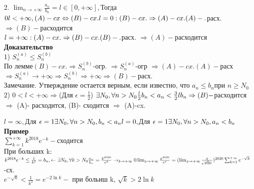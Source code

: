 \documentclass[12pt, a4paper]{article}
\begin{document}
 2. $ \lim_{n \rightarrow +\infty} \frac{a_n}{b_n}= l \in [0,+\infty], $Тогда
 	$ 0 l < +\infty, (A)- cx \Leftrightarrow (B)- cx. \\
 	l=0 : (B)-cx. \Rightarrow(A)- cx. \\
 	        (A)-.$расх. $ \Rightarrow (B) - $расходится\\
 $	l=+\infty : (A)-cx. \Rightarrow(B)- cx. \\
             (B)-.$расх. $ \Rightarrow (A) - $расходится\\
      \textbf{Доказательство}\\
      1) $ S_n^{(a)} \leq S_n^{(b)} $\\
      По лемме$(B) - cx. \Rightarrow  S_n^{(b)}$-огр. $ \Rightarrow S_n^{(a)} $-огр $ \Rightarrow (A) -cx. 
      (A)-$расх$ \Rightarrow S_n^{(a)} \rightarrow +\infty \Rightarrow S_n^{(b)} \Rightarrow +\infty \Rightarrow (B) -$расх. \\
       Замечание.  Утверждение остается верным, если известно, что $ a_n \leq b_n $при $ n \geq N_0 $
       2) $ 0 < l < +\infty \Rightarrow  $(Для $ \epsilon = \frac{1}{2} $) $ \exists N_0, \forall n > N_0 \\
       \frac{l}{2} b_n < a_n < \frac{3}{2} l b_n \\
      \Rightarrow  (B) - $расходится  $\Rightarrow$ (A)- расходится, (B)- сходится $ \Rightarrow $ (A)-cx. 
      
      $ l =\infty , $Для $ \epsilon =1 \exists N_0, \forall n > N_0 , b_n<a_n \\
         l =0 , $Для $ \epsilon =1 \exists N_0, \forall n > N_0 , a_n<b_n  \\$
         \textbf{Пример}\\
         $ \sum_{k=1}^{+\infty} k^{2018} e^{-k} - $сходится \\
         При больших k: $ k^{2018} e^{-k} \leq \frac{1}{k^2} =b_n,\leftarrow \exists N_0, \forall k > N_0 \\
         \frac{a_n}{b_n} = \frac{k^{2020}}{e^k} \rightarrow_{k \rightarrow + \infty} 0 \\
         \lim_{x \rightarrow + \infty} \frac{x^{2020}}{e^x} = (\lim_{x \rightarrow +\infty} \frac{x}{e^{\frac{x}{2020}}})^{2020} \\
         \sum_{k=1}^{+\infty} e^{- \sqrt{k}}$ -сх. \\
         $ e^{-\sqrt{k}}< \frac{1}{k^2} = e^{-2 \ln k} - $ при больиш k, $ \sqrt{k} > 2 \ln k $
\end{document}
